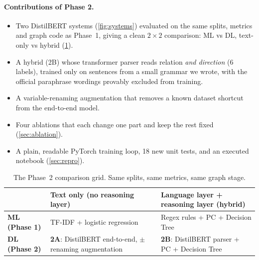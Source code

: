 \documentclass[12pt,a4paper]{article}
\newcommand{\thead}[1]{\textbf{#1}}
\begin{document}
\paragraph{Contributions of Phase 2.}
\begin{itemize}
  \item Two DistilBERT systems (\cref{fig:systems}) evaluated on the same splits, metrics and graph code as Phase~1, giving a
        clean $2\times2$ comparison: ML vs DL, text-only vs hybrid (\cref{tab:grid}).
  \item A hybrid (2B) whose transformer parser reads relation \emph{and direction} (6 labels), trained only on
        sentences from a small grammar we wrote, with the official paraphrase wordings provably excluded from training.
  \item A variable-renaming augmentation that removes a known dataset shortcut from the end-to-end model.
  \item Four ablations that each change one part and keep the rest fixed (\cref{sec:ablation}).
  \item A plain, readable PyTorch training loop, 18 new unit tests, and an executed notebook (\cref{sec:repro}).
\end{itemize}

\begin{table}[!htbp]
\centering\small
\caption{The Phase~2 comparison grid. Same splits, same metrics, same graph stage.}
\label{tab:grid}
\begin{tabularx}{\linewidth}{@{}l>{\raggedright}X>{\raggedright\arraybackslash}X@{}}
\toprule
& \thead{Text only (no reasoning layer)} & \thead{Language layer + reasoning layer (hybrid)} \\
\midrule
\textbf{ML (Phase 1)} & TF-IDF + logistic regression & Regex rules + PC + Decision Tree \\
\rowcolor{rowtint}\textbf{DL (Phase 2)} & \textbf{2A}: DistilBERT end-to-end, $\pm$ renaming augmentation &
  \textbf{2B}: DistilBERT parser + PC + Decision Tree \\
\bottomrule
\end{tabularx}
\end{table}
\end{document}
